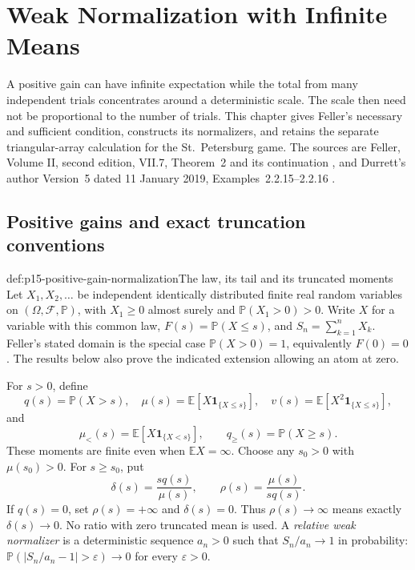 \chapter{Weak Normalization with Infinite Means}
\label{sec:p15-infinite-mean-weak-normalization}

A positive gain can have infinite expectation while the total from many
independent trials concentrates around a deterministic scale. The scale
then need not be proportional to the number of trials. This chapter
gives Feller's necessary and sufficient condition, constructs its
normalizers, and retains the separate triangular-array calculation for
the St.~Petersburg game. The sources are Feller, Volume II, second
edition, VII.7, Theorem~2 and its continuation
\cite[pp.~236--237]{Feller1971ProbabilityII}, and Durrett's author
Version~5 dated 11 January 2019, Examples~2.2.15--2.2.16
\cite[pp.~65--66]{DurrettPTEAuthor2019}.

\section{Positive gains and exact truncation conventions}
\label{sec:p15-positive-gain-conventions}

\begin{hbdefinition}{def:p15-positive-gain-normalization}{The law, its tail and its truncated moments}
Let \(X_1,X_2,\ldots\) be independent identically distributed finite
real random variables on \((\Omega,\mathcal F,\mathbb P)\), with
\(X_1\geq0\) almost surely and \(\mathbb P(X_1>0)>0\).
Write \(X\) for a variable with this common law,
\(F(s)=\mathbb P(X\leq s)\), and \(S_n=\sum_{k=1}^nX_k\).
Feller's stated domain is the special case \(\mathbb P(X>0)=1\),
equivalently \(F(0)=0\). The results below also prove the indicated
extension allowing an atom at zero.

For \(s>0\), define
\[
 q(s)=\mathbb P(X>s),\quad
 \mu(s)=\mathbb E[X\mathbf1_{\{X\leq s\}}],\quad
 v(s)=\mathbb E[X^2\mathbf1_{\{X\leq s\}}],
\]
and
\[
 \mu_<(s)=\mathbb E[X\mathbf1_{\{X<s\}}],\qquad
 q_{\geq}(s)=\mathbb P(X\geq s).
\]
These moments are finite even when \(\mathbb EX=\infty\).
Choose any \(s_0>0\) with \(\mu(s_0)>0\). For \(s\geq s_0\), put
\[
 \delta(s)=\frac{s q(s)}{\mu(s)},\qquad
 \rho(s)=\frac{\mu(s)}{s q(s)}.
\]
If \(q(s)=0\), set \(\rho(s)=+\infty\) and \(\delta(s)=0\).
Thus \(\rho(s)\to\infty\) means exactly \(\delta(s)\to0\).
No ratio with zero truncated mean is used.
A \emph{relative weak normalizer} is a deterministic sequence
\(a_n>0\) such that \(S_n/a_n\to1\) in probability:
\(\mathbb P(|S_n/a_n-1|>\varepsilon)\to0\) for every
\(\varepsilon>0\).
\end{hbdefinition}

